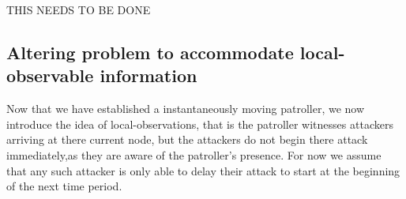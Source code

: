 \documentclass[a4paper,10pt]{article}
\theoremstyle{definition}
\theoremstyle{definition}
\theoremstyle{remark}
\theoremstyle{definition}
\begin{document}
\begin{huge}
THIS NEEDS TO BE DONE
\end{huge}



\subsection{Altering problem to accommodate local-observable information}
Now that we have established a instantaneously moving patroller, we now introduce the idea of local-observations, that is the patroller witnesses attackers arriving at there current node, but the attackers do not begin there attack immediately,as they are aware of the patroller's presence. For now we assume that any such attacker is only able to delay their attack to start at the beginning of the next time period.
\end{document}
